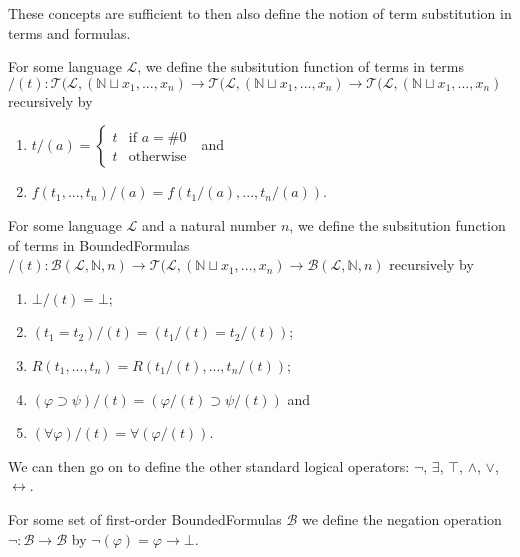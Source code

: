 These concepts are sufficient to then also define the notion of term substitution in terms and formulas. 
\begin{definition}\label{def:Term-Substitution}
\leanok
{}
For some language $\mathcal{L}$, we define the subsitution function of terms in terms $/(t) : \mathcal{T}(\mathcal{L},(\mathbb{N} \sqcup {x_1,...,x_n}) \to \mathcal{T}(\mathcal{L},(\mathbb{N} \sqcup {x_1,...,x_n}) \to \mathcal{T}(\mathcal{L},(\mathbb{N} \sqcup {x_1,...,x_n})$ recursively by
\begin{enumerate}
\item $t/(a) = \begin{cases}
    t & \text{if } a = \#0 \\
    t & \text{otherwise }
\end{cases}$ and
\item $f(t_1,...,t_n)/(a) = f(t_1/(a),...,t_n/(a))$.
\end{enumerate}

\begin{definition}\label{def:BF-Substitution}
\leanok
{}
For some language $\mathcal{L}$ and a natural number $n$, we define the subsitution function of terms in BoundedFormulas $/(t) : \mathcal{B}(\mathcal{L},\mathbb{N},n) \to \mathcal{T}(\mathcal{L},(\mathbb{N} \sqcup {x_1,...,x_n}) \to \mathcal{B}(\mathcal{L},\mathbb{N},n)$ recursively by
\begin{enumerate}
\item $\bot/(t) = \bot$;
\item $(t_1 = t_2)/(t) = (t_1/(t) = t_2/(t))$;
\item $R(t_1,...,t_n) = R(t_1/(t),...,t_n/(t))$;
\item $(\varphi \supset \psi)/(t) = (\varphi/(t) \supset \psi/(t))$ and
\item $(\forall \varphi)/(t) = \forall (\varphi/(t))$.
\end{enumerate}

\end{definition}

\end{definition}

We can then go on to define the other standard logical operators: $\neg$, $\exists$, $\top$, $\wedge$, $\vee$, $\leftrightarrow$.
\begin{definition}\label{def:FO-Neg}
  \leanok
  For some set of first-order BoundedFormulas $\mathcal{B}$ we define the negation operation $\neg : \mathcal{B} \to \mathcal{B}$ by $\neg(\varphi) = \varphi \rightarrow \bot$.
\end{definition}

